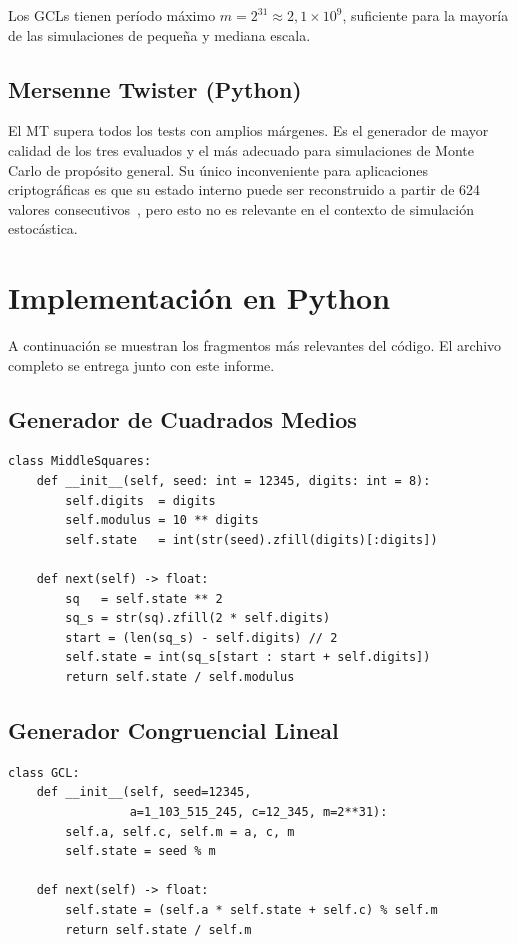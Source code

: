 \documentclass{article}
\begin{document}
Los GCLs tienen período máximo $m = 2^{31} \approx 2{,}1 \times 10^9$,
suficiente para la mayoría de las simulaciones de pequeña y mediana escala.

\subsection{Mersenne Twister (Python)}

El MT supera todos los tests con amplios márgenes.  Es el generador de
mayor calidad de los tres evaluados y el más adecuado para simulaciones de
Monte Carlo de propósito general.  Su único inconveniente para aplicaciones
criptográficas es que su estado interno puede ser reconstruido a partir de
624 valores consecutivos~\cite{matsumoto1998}, pero esto no es relevante
en el contexto de simulación estocástica.

\section{Implementación en Python}

A continuación se muestran los fragmentos más relevantes del código.
El archivo completo se entrega junto con este informe.

\subsection{Generador de Cuadrados Medios}

\begin{lstlisting}[caption={Clase MiddleSquares},label={lst:ms}]
class MiddleSquares:
    def __init__(self, seed: int = 12345, digits: int = 8):
        self.digits  = digits
        self.modulus = 10 ** digits
        self.state   = int(str(seed).zfill(digits)[:digits])

    def next(self) -> float:
        sq   = self.state ** 2
        sq_s = str(sq).zfill(2 * self.digits)
        start = (len(sq_s) - self.digits) // 2
        self.state = int(sq_s[start : start + self.digits])
        return self.state / self.modulus
\end{lstlisting}

\subsection{Generador Congruencial Lineal}

\begin{lstlisting}[caption={Clase GCL},label={lst:gcl}]
class GCL:
    def __init__(self, seed=12345,
                 a=1_103_515_245, c=12_345, m=2**31):
        self.a, self.c, self.m = a, c, m
        self.state = seed % m

    def next(self) -> float:
        self.state = (self.a * self.state + self.c) % self.m
        return self.state / self.m
\end{lstlisting}
\end{document}
